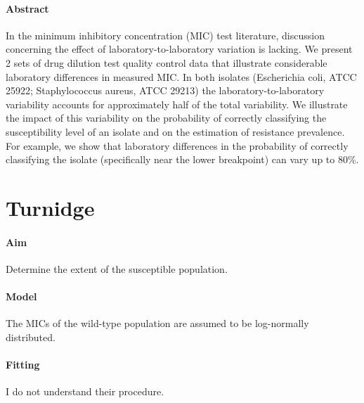 \documentclass[a4paper]{article}
\begin{document}
\paragraph{Abstract} In the minimum inhibitory concentration (MIC) test literature, discussion concerning the effect of laboratory-to-laboratory variation is lacking. We present 2 sets of drug dilution test quality control data that illustrate considerable laboratory differences in measured MIC. In both isolates (Escherichia coli, ATCC 25922; Staphylococcus aureus, ATCC 29213) the laboratory-to-laboratory variability accounts for approximately half of the total variability. We illustrate the impact of this variability on the probability of correctly classifying the susceptibility level of an isolate and on the estimation of resistance prevalence. For example, we show that laboratory differences in the probability of correctly classifying the isolate (specifically near the lower breakpoint) can vary up to 80\%.



\section{Turnidge \cite{Turnidge2006}}
\paragraph{Aim} Determine the extent of the susceptible population.
\paragraph{Model} The MICs of the wild-type population are assumed to be log-normally distributed.
\paragraph{Fitting} I do not understand their procedure.
\end{document}
